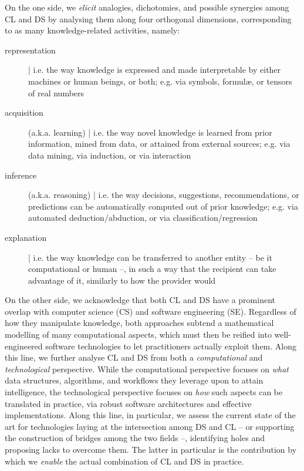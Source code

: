 \documentclass[12pt,a4paper,openright,twoside]{book}
\begin{document}
On the one side, we \emph{elicit} analogies, dichotomies, and possible synergies among CL and DS by analysing them along four orthogonal dimensions, corresponding to as many knowledge-related activities, namely:
%
\begin{description}
    \item[representation] | i.e. the way knowledge is expressed and made interpretable by either machines or human beings, or both; e.g. via symbols, formul\ae, or tensors of real numbers

    \item[acquisition] (a.k.a. learning) | i.e. the way novel knowledge is learned from prior information, mined from data, or attained from external sources; e.g. via data mining, via induction, or via interaction

    \item[inference] (a.k.a. reasoning) |  i.e. the way decisions, suggestions, recommendations, or predictions can be automatically computed out of prior knowledge; e.g. via automated deduction/abduction, or via classification/regression

    \item[explanation] | i.e. the way knowledge can be transferred to another entity -- be it computational or human --, in such a way that the recipient can take advantage of it, similarly to how the provider would
\end{description}

On the other side, we acknowledge that both CL and DS have a prominent overlap with computer science (CS) and software engineering (SE).
%
Regardless of how they manipulate knowledge, both approaches subtend a mathematical modelling of many computational aspects, which must then be reified into well-engineered software technologies to let practitioners actually exploit them.
%
Along this line, we further analyse CL and DS from both a \emph{computational} and \emph{technological} perspective.
%
While the computational perspective focuses on \emph{what} data structures, algorithms, and workflows they leverage upon to attain intelligence, the technological perspective focuses on \emph{how} such aspects can be translated in practice, via robust software architectures and effective implementations.
%
Along this line, in particular, we assess the current state of the art for technologies laying at the intersection among DS and CL -- or supporting the construction of bridges among the two fields --, identifying holes and proposing lacks to overcome them.
%
The latter in particular is the contribution by which we \emph{enable} the actual combination of CL and DS in practice.
\end{document}
